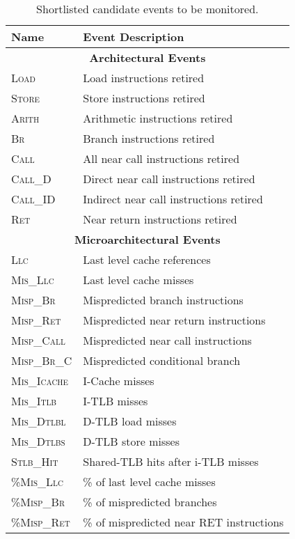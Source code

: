 \documentclass{acm_proc_article-sp}
\begin{document}
\begin{table}
\centering
\footnotesize
\begin{tabular}{|l|l|} \hline
\textbf{Name} & \textbf{Event Description}\\ \hline \hline
	\multicolumn{2}{|c|}{\textbf{Architectural Events}}\\ \hline
\textsc{Load} & Load instructions retired\\ \hline
\textsc{Store} & Store instructions retired\\ \hline
\textsc{Arith} & Arithmetic instructions retired\\ \hline
\textsc{Br} & Branch instructions retired \\ \hline
\textsc{Call} & All near call instructions retired\\ \hline
\textsc{Call\_D} & Direct near call instructions retired\\ \hline
\textsc{Call\_ID} & Indirect near call instructions retired\\ \hline
\textsc{Ret} & Near return instructions retired \\ \hline \hline
	\multicolumn{2}{|c|}{\textbf{Microarchitectural Events}}\\ \hline
\textsc{Llc} & Last level cache references\\ \hline
\textsc{Mis\_Llc} & Last level cache misses\\ \hline
\textsc{Misp\_Br} & Mispredicted branch instructions\\ \hline
\textsc{Misp\_Ret} & Mispredicted near return instructions\\  \hline
\textsc{Misp\_Call} & Mispredicted near call instructions\\ \hline
\textsc{Misp\_Br\_C} & Mispredicted conditional branch \\ \hline
\textsc{Mis\_Icache} & I-Cache misses\\ \hline
\textsc{Mis\_Itlb} & I-TLB misses\\ \hline
\textsc{Mis\_Dtlbl} & D-TLB load misses\\ \hline
\textsc{Mis\_Dtlbs} & D-TLB store misses\\ \hline
\textsc{Stlb\_Hit} & Shared-TLB hits after i-TLB misses\\ \hline
\textsc{\%Mis\_Llc}\footnotemark[5] & \% of last level cache misses \\ \hline
\textsc{\%Misp\_Br}\footnotemark[5] & \% of mispredicted branches\\ \hline
\textsc{\%Misp\_Ret}\footnotemark[5] & \% of mispredicted near RET instructions\\ \hline
\end{tabular}
\caption{Shortlisted candidate events to be monitored.}
\label{tbl:eventtypes}
\end{table}
\end{document}
